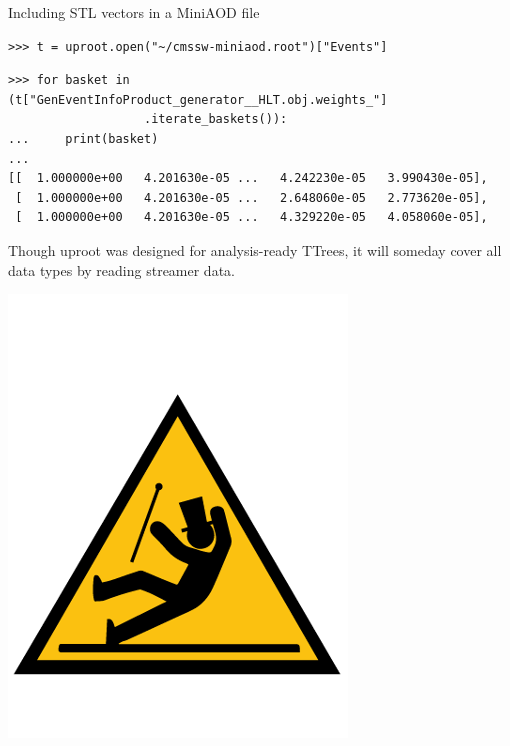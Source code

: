 \documentclass[aspectratio=169]{beamer}
\begin{document}
\begin{frame}[fragile]{Including STL vectors in a MiniAOD file}
\vspace{0.25 cm}
\small
\begin{verbatim}
>>> t = uproot.open("~/cmssw-miniaod.root")["Events"]
\end{verbatim}
\begin{verbatim}
>>> for basket in (t["GenEventInfoProduct_generator__HLT.obj.weights_"]
                   .iterate_baskets()):
...     print(basket)
...
[[  1.000000e+00   4.201630e-05 ...   4.242230e-05   3.990430e-05],
 [  1.000000e+00   4.201630e-05 ...   2.648060e-05   2.773620e-05],
 [  1.000000e+00   4.201630e-05 ...   4.329220e-05   4.058060e-05],
\end{verbatim}

\vspace{0.25 cm}
Though uproot was designed for analysis-ready TTrees, it will someday cover all data types by reading streamer data.

\hfill \includegraphics[width=1.5 cm]{caution.png}\hspace{-0.9 cm}
\end{frame}
\end{document}
